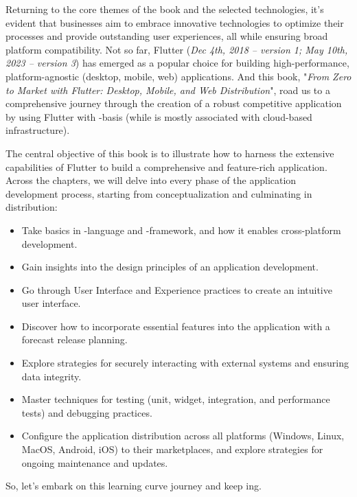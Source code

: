 Returning to the core themes of the book and the selected technologies, it's evident that businesses aim to embrace 
innovative technologies to optimize their processes and provide outstanding user experiences, all while ensuring 
broad platform compatibility. Not so far, Flutter (\emph{Dec 4th, 2018 -- version 1; May 10th, 2023 -- version 3}) 
has emerged as a popular choice for building high-performance, platform-agnostic (desktop, mobile, web) applications. 
And this book, "\emph{From Zero to Market with Flutter: Desktop, Mobile, and Web Distribution}", road us to a 
comprehensive journey through the creation of a robust competitive application by using Flutter with 
-basis (while  is mostly associated with cloud-based infrastructure).

The central objective of this book is to illustrate how to harness the extensive capabilities of Flutter to build a 
comprehensive and feature-rich application. Across the chapters, we will delve into every phase of the application 
development process, starting from conceptualization and culminating in distribution:

\begin{itemize}
    \item Take basics in -language and -framework, and how it enables cross-platform development.

    \item Gain insights into the design principles of an application development. 
    
    \item Go through User Interface and Experience practices to create an intuitive user interface.

    \item Discover how to incorporate essential features into the application with a forecast release planning.

    \item Explore strategies for securely interacting with external systems and ensuring data integrity.

    \item Master techniques for testing (unit, widget, integration, and performance tests) and debugging practices. 

    \item Configure the application distribution across all platforms (Windows, Linux, MacOS, Android, iOS) to their 
    marketplaces, and explore strategies for ongoing maintenance and updates.
\end{itemize}

\noindent So, let's embark on this learning curve journey and keep ing.